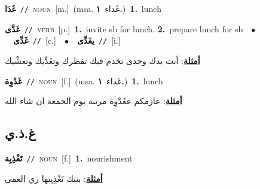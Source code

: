 \documentclass[10pt,a4paper,twoside]{article} %
\begin{document}
\begin{multicols}{2}
{\setlength\topsep{0pt}\textbf{\foreignlanguage{arabic}{غَدَا}}\ {\color{gray}\texttt{//}\color{black}}\ \textsc{noun}\ [m.]\ \color{gray}(msa. \foreignlanguage{arabic}{غَداء}~\foreignlanguage{arabic}{\textbf{١.}})\color{black}\ \textbf{1.}~lunch\ } \vspace{2mm}

{\setlength\topsep{0pt}\textbf{\foreignlanguage{arabic}{غَدَّى}}\ {\color{gray}\texttt{//}\color{black}}\ \textsc{verb}\ [p.]\ \textbf{1.}~invite sb for lunch.  \textbf{2.}~prepare lunch for sb\ \ $\bullet$\ \ \setlength\topsep{0pt}\textbf{\foreignlanguage{arabic}{غَدِّى}}\ {\color{gray}\texttt{//}\color{black}}\ [c.]\ \ $\bullet$\ \ \setlength\topsep{0pt}\textbf{\foreignlanguage{arabic}{يغَدِّى}}\ {\color{gray}\texttt{//}\color{black}}\ [i.]\  \begin{flushright}\color{gray}\foreignlanguage{arabic}{\textbf{\underline{\foreignlanguage{arabic}{أمثلة}}}: أنت بدك وحدى تخدم فيك تفطرك وتغَدِّيك وتعشِّيك}\end{flushright}\color{black}} \vspace{2mm}

{\setlength\topsep{0pt}\textbf{\foreignlanguage{arabic}{غَدْوِة}}\ {\color{gray}\texttt{//}\color{black}}\ \textsc{noun}\ [f.]\ \color{gray}(msa. \foreignlanguage{arabic}{غَداء}~\foreignlanguage{arabic}{\textbf{١.}})\color{black}\ \textbf{1.}~lunch\  \begin{flushright}\color{gray}\foreignlanguage{arabic}{\textbf{\underline{\foreignlanguage{arabic}{أمثلة}}}: عازمكم عغَدْوِة مرتبة يوم الجمعة ان شاء الله}\end{flushright}\color{black}} \vspace{2mm}

\vspace{-3mm}
\subsection*{\color{blue}\foreignlanguage{arabic}{غ.ذ.ي}\color{blue}{}} 

{\setlength\topsep{0pt}\textbf{\foreignlanguage{arabic}{تَغْذِيِة}}\ {\color{gray}\texttt{//}\color{black}}\ \textsc{noun}\ [f.]\ \textbf{1.}~nourishment\  \begin{flushright}\color{gray}\foreignlanguage{arabic}{\textbf{\underline{\foreignlanguage{arabic}{أمثلة}}}: بنتك تَغْذِيِتها زي العمى}\end{flushright}\color{black}} \vspace{2mm}


\end{multicols}
\end{document}

